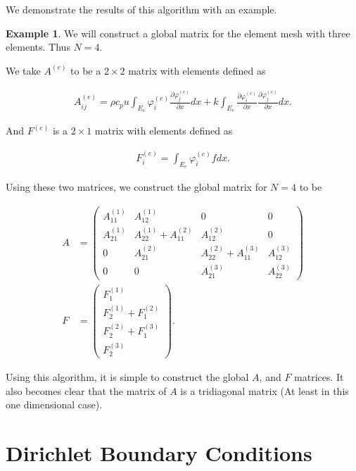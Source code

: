 \documentclass[10pt]{amsart}
\numberwithin{equation}{section}
\theoremstyle{definition}
\newtheorem{example}{Example}[section]
\newcommand{\pder}[2][]{\frac{\partial#1}{\partial#2}}
\begin{document}
\begin{multicols}{2}
We demonstrate the results of this algorithm with an example.

\begin{example}
  We will construct a global matrix for the element mesh with three elements.
  Thus $N=4$.

  We take $A^{(e)}$ to be a $2\times 2$ matrix with elements defined as

  \begin{align*}
    A_{ij}^{(e)}=\rho c_p u \int_{E_e}\varphi_i^{(e)}\pder[\varphi_j^{(e)}]{x}dx+
    k\int_{E_e}\pder[\varphi_i^{(e)}]{x}\pder[\varphi_j^{(e)}]{x}dx.
  \end{align*}

  And $F^{(e)}$ is a $2\times 1$ matrix with elements defined as

  \begin{align*}
    F_i^{(e)}=\int_{E_e}\varphi_i^{(e)}fdx.
  \end{align*}

  Using these two matrices, we construct the global matrix for $N=4$ to be

  \begin{align*}
    A&=\begin{pmatrix}
      A_{11}^{(1)} & A_{12}^{(1)} & 0 & 0\\
      A_{21}^{(1)} & A_{22}^{(1)}+A_{11}^{(2)} & A_{12}^{(2)} & 0\\
      0 & A_{21}^{(2)} & A_{22}^{(2)}+A_{11}^{(3)} & A_{12}^{(3)}\\
      0 & 0 & A_{21}^{(3)} & A_{22}^{(3)}
    \end{pmatrix}\\
    F&=\begin{pmatrix}
      F_1^{(1)}\\
      F_2^{(1)}+F_1^{(2)}\\
      F_2^{(2)}+F_1^{(3)}\\
      F_2^{(3)}
    \end{pmatrix}.
  \end{align*}
\end{example}

Using this algorithm, it is simple to construct the global $A$, and $F$
matrices. It also becomes clear that the matrix of $A$ is a tridiagonal
matrix (At least in this one dimensional case).

\section{Dirichlet Boundary Conditions}%
\label{sec:section_name}


\end{multicols}
\end{document}
